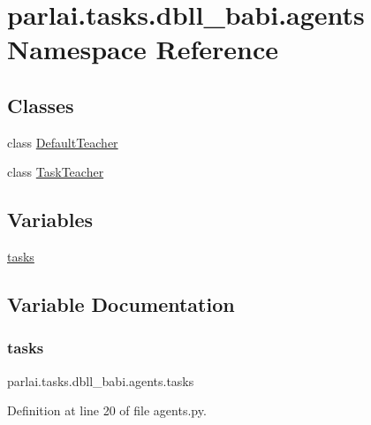 \hypertarget{namespaceparlai_1_1tasks_1_1dbll__babi_1_1agents}{}\section{parlai.\+tasks.\+dbll\+\_\+babi.\+agents Namespace Reference}
\label{namespaceparlai_1_1tasks_1_1dbll__babi_1_1agents}
\subsection*{Classes}
\begin{DoxyCompactItemize}
\item 
class \hyperlink{classparlai_1_1tasks_1_1dbll__babi_1_1agents_1_1DefaultTeacher}{Default\+Teacher}
\item 
class \hyperlink{classparlai_1_1tasks_1_1dbll__babi_1_1agents_1_1TaskTeacher}{Task\+Teacher}
\end{DoxyCompactItemize}
\subsection*{Variables}
\begin{DoxyCompactItemize}
\item 
\hyperlink{namespaceparlai_1_1tasks_1_1dbll__babi_1_1agents_a195d50431a5eeb501b2db112298fefbc}{tasks}
\end{DoxyCompactItemize}


\subsection{Variable Documentation}
\mbox{\label{namespaceparlai_1_1tasks_1_1dbll__babi_1_1agents_a195d50431a5eeb501b2db112298fefbc}} 
\subsubsection{\texorpdfstring{tasks}{tasks}}
{\footnotesize\ttfamily parlai.\+tasks.\+dbll\+\_\+babi.\+agents.\+tasks}



Definition at line 20 of file agents.\+py.


